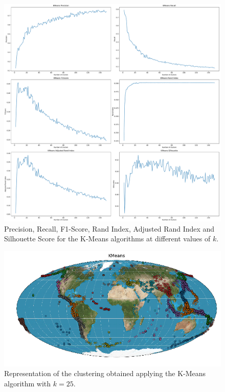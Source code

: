 \documentclass[a4paper]{article}
\begin{document}
	\begin{figure}
		\includegraphics[width=\linewidth]{kmeans_indeces.pdf}
		\caption{Precision, Recall, F1-Score, Rand Index, Adjusted Rand Index and Silhouette Score for the K-Means algorithms at different values of $k$.}
		\label{fig:kmeans}
	\end{figure}
	\begin{figure}
		\includegraphics[width=\linewidth]{kmeans_world.png}
		\caption{Representation of the clustering obtained applying the K-Means algorithm with $k= 25$.}
		\label{fig:kmeans_world}
	\end{figure}
\end{document}
